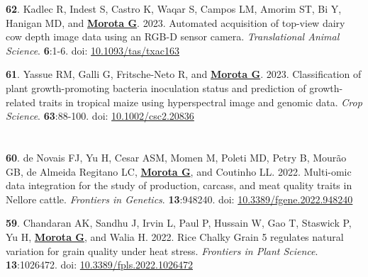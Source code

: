 \documentclass[margin,line,10pt]{res}
\newenvironment{list1}{
  \begin{list}{\ding{113}}{%
      \setlength{\itemsep}{0in}
      \setlength{\parsep}{0in} \setlength{\parskip}{0in}
      \setlength{\topsep}{0in} \setlength{\partopsep}{0in} 
      \setlength{\leftmargin}{0.17in}}}{\end{list}}
\begin{document}
\begin{resume}
\begin{list1}
  \vspace{0.5cm}

  \item  [{\bf 62}.] Kadlec R, Indest S, Castro K, Waqar S, Campos LM, Amorim ST, Bi Y, Hanigan MD, and \textbf{\underline{Morota G}}. 2023. Automated acquisition of top-view dairy cow depth image data using an RGB-D sensor camera. \emph{Translational Animal Science}. \textbf{6}:1-6. doi: \textcolor{blue}{\href{https://doi.org/10.1093/tas/txac163}{10.1093/tas/txac163}}  

       \vspace{0.5cm}

  \item [{\bf 61}.] Yassue RM, Galli G, Fritsche-Neto R, and \textbf{\underline{Morota G}}. 2023. Classification of plant growth-promoting bacteria inoculation status and prediction of growth-related traits in tropical maize using hyperspectral image and genomic data. \emph{Crop Science}. \textbf{63}:88-100. doi: \textcolor{blue}{\href{https://doi.org/10.1002/csc2.20836}{10.1002/csc2.20836}}  


\end{list1}


\section{}
\begin{list1}

  \item [{\bf 60}.] de Novais FJ, Yu H, Cesar ASM, Momen M, Poleti MD, Petry B, Mour{\~a}o GB, de Almeida Regitano LC, \textbf{\underline{Morota G}}, and Coutinho LL. 2022. Multi-omic data integration for the study of production, carcass, and meat quality traits in Nellore cattle. \emph{Frontiers in Genetics}. \textbf{13}:948240. doi: \textcolor{blue}{\href{https://doi.org/10.3389/fgene.2022.948240}{10.3389/fgene.2022.948240}} 


  \vspace{0.5cm}

  \item  [{\bf 59}.] Chandaran AK, Sandhu J, Irvin L,  Paul P, Hussain W, Gao T, Staswick P, Yu H, \textbf{\underline{Morota G}}, and Walia H. 2022. Rice Chalky Grain 5 regulates natural variation for grain quality under heat stress. \emph{Frontiers in Plant Science}. \textbf{13}:1026472. doi: \textcolor{blue}{\href{https://doi.org/10.3389/fpls.2022.1026472}{10.3389/fpls.2022.1026472}} 
           
  \vspace{0.5cm}


\end{list1}
\end{resume}
\end{document}
